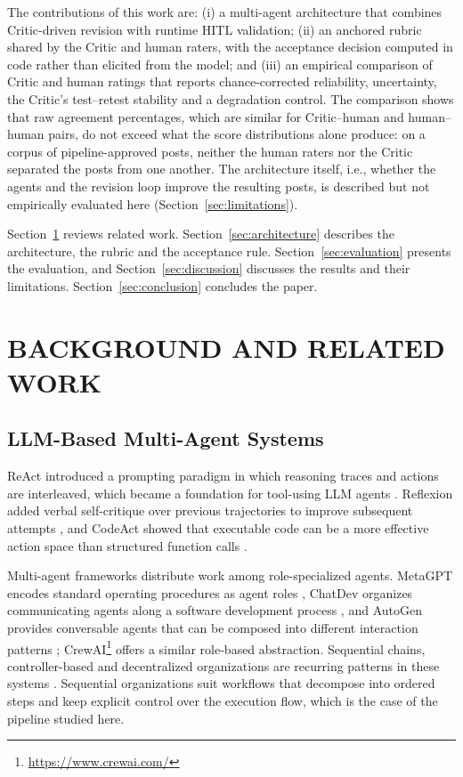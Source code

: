 \documentclass[a4paper,twoside]{article}
\begin{document}
The contributions of this work are: (i) a multi-agent architecture that combines Critic-driven revision with runtime HITL validation; (ii) an anchored rubric shared by the Critic and human raters, with the acceptance decision computed in code rather than elicited from the model; and (iii) an empirical comparison of Critic and human ratings that reports chance-corrected reliability, uncertainty, the Critic's test--retest stability and a degradation control. The comparison shows that raw agreement percentages, which are similar for Critic--human and human--human pairs, do not exceed what the score distributions alone produce: on a corpus of pipeline-approved posts, neither the human raters nor the Critic separated the posts from one another. The architecture itself, i.e., whether the agents and the revision loop improve the resulting posts, is described but not empirically evaluated here (Section~\ref{sec:limitations}).

Section~\ref{sec:related} reviews related work. Section~\ref{sec:architecture} describes the architecture, the rubric and the acceptance rule. Section~\ref{sec:evaluation} presents the evaluation, and Section~\ref{sec:discussion} discusses the results and their limitations. Section~\ref{sec:conclusion} concludes the paper.

\section{\uppercase{Background and Related Work}}
\label{sec:related}

\subsection{LLM-Based Multi-Agent Systems}

ReAct introduced a prompting paradigm in which reasoning traces and actions are interleaved, which became a foundation for tool-using LLM agents \cite{yao2023react}. Reflexion added verbal self-critique over previous trajectories to improve subsequent attempts \cite{shinn2023reflexion}, and CodeAct showed that executable code can be a more effective action space than structured function calls \cite{wang2024executable}.

Multi-agent frameworks distribute work among role-specialized agents. MetaGPT encodes standard operating procedures as agent roles \cite{hong2024metagpt}, ChatDev organizes communicating agents along a software development process \cite{qian2024chatdev}, and AutoGen provides conversable agents that can be composed into different interaction patterns \cite{wu2024autogen}; CrewAI\footnote{\url{https://www.crewai.com/}} offers a similar role-based abstraction. Sequential chains, controller-based and decentralized organizations are recurring patterns in these systems \cite{sapkota2025langchain}. Sequential organizations suit workflows that decompose into ordered steps and keep explicit control over the execution flow, which is the case of the pipeline studied here.
\end{document}
